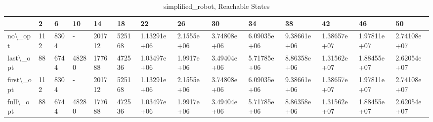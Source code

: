 \begin{table}
\centering
\caption{simplified\_robot, Reachable States}
\label{simplified_robot_reach}
\begin{tabular}{llllllllllllll}
\toprule
{} &    2 &     6 &     10 &      14 &      18 &           22 &          26 &           30 &           34 &           38 &           42 &           46 &           50 \\
\midrule
no\textbackslash \_opt    &  112 &  8304 &      - &  201712 &  525168 &  1.13291e+06 &  2.1555e+06 &  3.74808e+06 &  6.09035e+06 &  9.38661e+06 &  1.38657e+07 &  1.97811e+07 &  2.74108e+07 \\
last\textbackslash \_opt  &   88 &  6744 &  48280 &  177688 &  472536 &  1.03497e+06 &  1.9917e+06 &  3.49404e+06 &  5.71785e+06 &  8.86358e+06 &  1.31562e+07 &  1.88455e+07 &  2.62054e+07 \\
first\textbackslash \_opt &  112 &  8304 &      - &  201712 &  525168 &  1.13291e+06 &  2.1555e+06 &  3.74808e+06 &  6.09035e+06 &  9.38661e+06 &  1.38657e+07 &  1.97811e+07 &  2.74108e+07 \\
full\textbackslash \_opt  &   88 &  6744 &  48280 &  177688 &  472536 &  1.03497e+06 &  1.9917e+06 &  3.49404e+06 &  5.71785e+06 &  8.86358e+06 &  1.31562e+07 &  1.88455e+07 &  2.62054e+07 \\
\bottomrule
\end{tabular}
\end{table}
